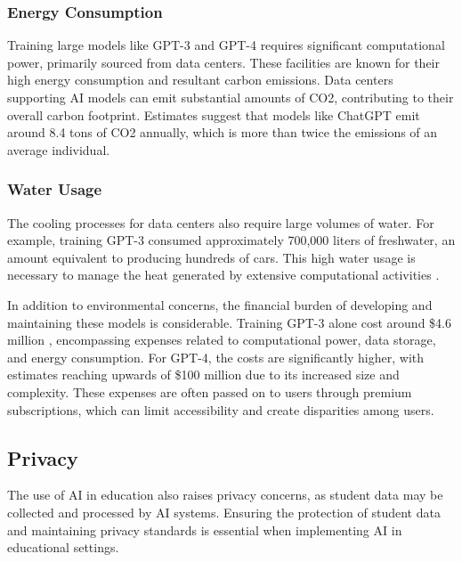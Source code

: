 \documentclass{article}
\begin{document}
\subsubsection{Energy Consumption}

Training large models like GPT-3 and GPT-4 requires significant
computational power, primarily sourced from data centers.
These facilities are known for their high energy consumption
and resultant carbon emissions. Data centers supporting AI
models can emit substantial amounts of CO2, contributing
to their overall carbon footprint. Estimates suggest that
models like ChatGPT emit around 8.4 tons of CO2 annually,
which is more than twice the emissions of an average individual.

\subsubsection{Water Usage}

The cooling processes for data centers also require
large volumes of water. For example, training GPT-3 consumed
approximately 700,000 liters of freshwater, an amount equivalent
to producing hundreds of cars. This high water usage is necessary
to manage the heat generated by extensive computational activities \cite{earth2023environmental}.

In addition to environmental concerns, the financial burden
of developing and maintaining these models is considerable.
Training GPT-3 alone cost around \$4.6 million \cite{wikipedia2024gpt3},
encompassing expenses related to computational power, data storage, and
energy consumption. For GPT-4, the costs are significantly higher,
with estimates reaching upwards of \$100 million \cite{wired2023altman}
due to its increased size and complexity.
These expenses are often passed on to users through premium subscriptions, which can limit accessibility and create disparities
among users.









\subsection{Privacy}

The use of AI in education also raises privacy concerns,
as student data may be collected and processed by AI systems.
Ensuring the protection of student data and maintaining privacy
standards is essential when implementing AI in educational settings.
\end{document}
